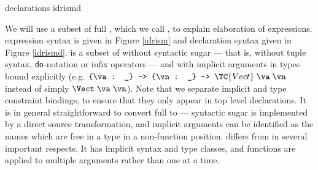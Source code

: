 {\IdrisM{} declarations}
{idrismd}

We will use a subset of full \Idris{}, which we call \IdrisM{}, to explain
elaboration of expressions. \IdrisM{} expression syntax is given in Figure
\ref{idrism} and declaration syntax given in Figure \ref{idrismd}.
\IdrisM{} is a subset of \Idris{} without syntactic sugar --- that is, without
tuple syntax, \texttt{do}-notation or infix operators --- and with implicit
arguments in types bound explicitly 
(e.g. $\piimp{\va}{\_}\piimp{\vn}{\_}\TC{Vect}\;\va\;\vn$
instead of simply $\Vect\;\va\;\vn$).
Note that we separate implicit and type constraint bindings, to ensure that they
only appear in top level declarations.
It is in general straightforward to
convert full \Idris{} to \IdrisM{} --- syntactic sugar is implemented by a
direct source transformation, and implicit arguments can be identified as the names
which are free in a type in a non-function position.
%
\IdrisM{} differs from \TT{} in several important respects. It has implicit
syntax and type classes, and functions are applied to multiple arguments rather
than one at a time. 

